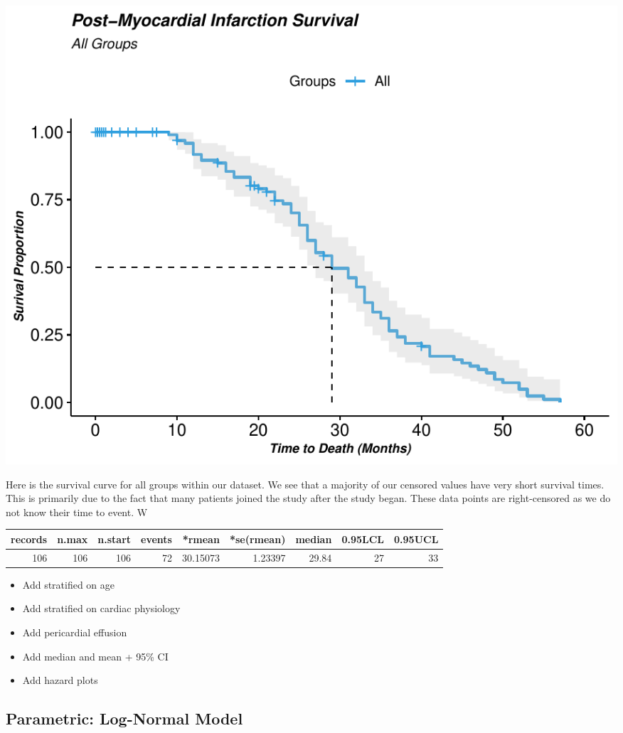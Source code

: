 \documentclass[
]{article}
\begin{document}
\begin{center}\includegraphics{markdown_files/figure-latex/km.all-1} \end{center}

Here is the survival curve for all groups within our dataset. We see
that a majority of our censored values have very short survival times.
This is primarily due to the fact that many patients joined the study
after the study began. These data points are right-censored as we do not
know their time to event. W

\begin{table}[!h]
\centering
\begin{tabular}{r|r|r|r|r|r|r|r|r}
\hline
records & n.max & n.start & events & *rmean & *se(rmean) & median & 0.95LCL & 0.95UCL\\
\hline
106 & 106 & 106 & 72 & 30.15073 & 1.23397 & 29.84 & 27 & 33\\
\hline
\end{tabular}
\end{table}

\begin{itemize}
\item
  Add stratified on age
\item
  Add stratified on cardiac physiology
\item
  Add pericardial effusion
\item
  Add median and mean + 95\% CI
\item
  Add hazard plots
\end{itemize}

\hypertarget{parametric-log-normal-model}{%
\subsection{Parametric: Log-Normal
Model}\label{parametric-log-normal-model}}
\end{document}
